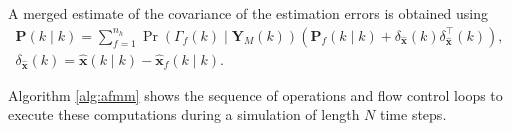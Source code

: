 A merged estimate of the covariance of the estimation errors is obtained using
\begin{equation} \label{eq:Pk_MKF}
	\begin{aligned}
	\mathbf{P}(k \mid k) = \sum_{f=1}^{n_h} \Pr(\Gamma_f(k) \mid \mathbf{Y}_M(k)) \left( \mathbf{P}_f(k \mid k) + \delta_\mathbf{\hat{x}}(k) \delta_\mathbf{\hat{x}}^\intercal(k) \right), \\
	\delta_\mathbf{\hat{x}}(k) = \mathbf{\hat{x}}(k \mid k) - \mathbf{\hat{x}}_f(k \mid k).
	\end{aligned}
\end{equation}

Algorithm \ref{alg:afmm} shows the sequence of operations and flow control loops to execute these computations during a simulation of length $N$ time steps.
%
